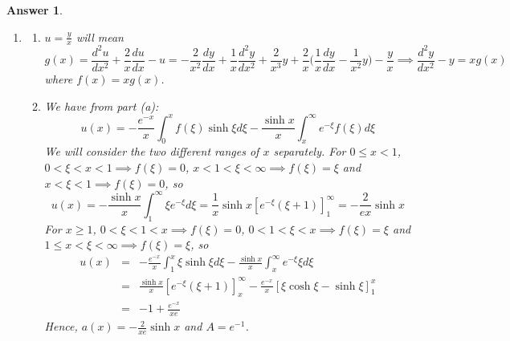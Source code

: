 \documentclass[a4paper]{article}
\newtheorem{ans}{Answer}[section]
\theoremstyle{new}
\begin{document}
\begin{ans}
\begin{enumerate}[label=(\alph*)]
$$        \begin{array}{ll}
      -e^{-\xi}\sinh(x) & 0\leq x<\xi<\infty \\
     -e^{-x}\sinh\xi& 0\leq\xi<x<\infty
        \end{array}
    \right.$$
The general solution will be
$$y(x)=\int_0^\infty f(\xi)G(x,\xi)d\xi=-e^{-x}\int_0^xf(\xi)\sinh\xi d\xi-\sinh x\int_x^\infty e^{-\xi}f(\xi)d\xi$$
\item \begin{enumerate}[label=(\roman*)]
\item $u=\frac{y}{x}$ will mean
$$g(x)=\frac{d^2u}{dx^2}+\frac{2}{x}\frac{du}{dx}-u=-\frac{2}{x^2}\frac{dy}{dx}+\frac{1}{x}\frac{d^2y}{dx^2}+\frac{2}{x^3}y+\frac{2}{x}\bigg(\frac{1}{x}\frac{dy}{dx}-\frac{1}{x^2}y\bigg)-\frac{y}{x}\implies\frac{d^2y}{dx^2}-y=xg(x)$$
where $f(x)=xg(x)$.
\item We have from part (a):
$$u(x)=-\frac{e^{-x}}{x}\int_0^xf(\xi)\sinh\xi d\xi-\frac{\sinh x}{x}\int_x^\infty e^{-\xi}f(\xi)d\xi$$
We will consider the two different ranges of $x$ separately. For $0\leq x<1$, $0<\xi<x<1\implies f(\xi)=0$, $x<1<\xi<\infty\implies f(\xi)=\xi$ and  $x<\xi<1\implies f(\xi)=0$, so
$$u(x)=-\frac{\sinh x}{x}\int_1^\infty \xi e^{-\xi}d\xi=\frac{1}{x}\sinh x[e^{-\xi}(\xi+1)]_1^\infty=-\frac{2}{ex}\sinh x$$
For $x\geq 1$, $0<\xi<1<x\implies f(\xi)=0$, $0<1<\xi<x\implies f(\xi)=\xi$ and $1\leq x<\xi<\infty\implies f(\xi)=\xi$, so
\begin{eqnarray}
u(x)&=&-\frac{e^{-x}}{x}\int_1^x\xi\sinh\xi d\xi-\frac{\sinh x}{x}\int_x^\infty e^{-\xi}\xi d\xi\nonumber\\&=&\frac{\sinh x}{x}[e^{-\xi}(\xi+1)]_x^\infty -\frac{e^{-x}}{x}[\xi\cosh\xi-\sinh\xi]_1^x\nonumber\\&=&-1+\frac{e^{-x}}{xe}\nonumber
\end{eqnarray}
Hence, $a(x)=-\frac{2}{xe}\sinh x$ and $A=e^{-1}$. 
\end{enumerate}
\end{enumerate}
\end{ans}
\newpage
\end{document}

